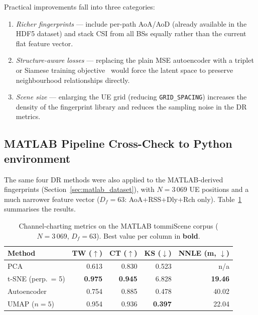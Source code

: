 Practical improvements fall into three categories:
\begin{enumerate}
  \item \emph{Richer fingerprints} --- include per-path AoA/AoD (already
        available in the HDF5 dataset) and stack CSI from all BSs
        equally rather than the current flat feature vector.
  \item \emph{Structure-aware losses} --- replacing the plain MSE
        autoencoder with a triplet or Siamese training
        objective~\cite{lei2019siamese_cc} would force the latent space
        to preserve neighbourhood relationships directly.
  \item \emph{Scene size} --- enlarging the UE grid (reducing
        \texttt{GRID\_SPACING}) increases the density of the fingerprint
        library and reduces the sampling noise in the DR metrics.
\end{enumerate}

\subsection{MATLAB Pipeline Cross-Check to Python environment}
\label{sec:matlab_channel_charting}

The same four DR methods were also applied to the MATLAB-derived
 fingerprints (Section~\ref{sec:matlab_dataset}),
with $N=3\,069$ UE positions and a much narrower feature vector
($D_f = 63$: AoA+RSS+Dly+Rch only).
Table~\ref{tab:cc_matlab} summarises the results.

\begin{table}[htbp]
\caption{Channel-charting metrics on the MATLAB tommiScene corpus ($N = 3\,069$, $D_f = 63$).  Best value per column in \textbf{bold}.}
\label{tab:cc_matlab}
\centering
\begin{tabular}{lrrrr}
\toprule
Method              & TW ($\uparrow$) & CT ($\uparrow$) & KS ($\downarrow$) & NNLE (m, $\downarrow$) \\
\midrule
PCA                 & 0.613            & 0.830            & 0.523              & n/a \\
t-SNE (perp.\ = 5)  & \textbf{0.975}   & \textbf{0.945}   & 6.828              & \textbf{19.46} \\
Autoencoder         & 0.754            & 0.885            & 0.478              & 40.02 \\
UMAP ($n=5$)        & 0.954            & 0.936            & \textbf{0.397}     & 22.04 \\
\bottomrule
\end{tabular}
\end{table}


